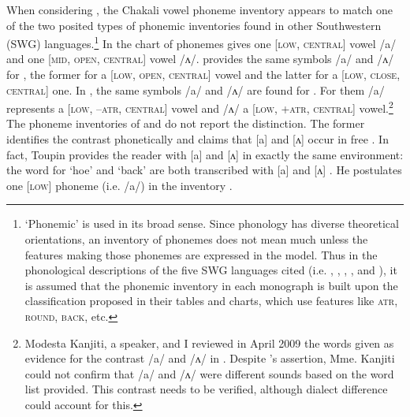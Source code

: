 When considering  \cite{Rowl65, Crou66, Gray69,   Toup95, Crou03}, the Chakali vowel phoneme 
inventory appears to match one of the two posited types of  phonemic inventories found in other  
Southwestern  (SWG) languages.\footnote{`Phonemic' is used in its broad sense. Since phonology 
has diverse theoretical orientations,  an inventory of phonemes does not mean much unless the 
features making those phonemes are expressed in the model.  Thus in the phonological descriptions 
of the five SWG languages cited (i.e. , , ,  , and  ), it is assumed 
that the phonemic inventory in each monograph is built upon the classification proposed in their 
tables and charts, which use features like \textsc{atr}, \textsc{round}, \textsc{back}, etc.} In 
\citet[15]{Rowl65} the chart of  phonemes gives one [\textsc{low}, \textsc{central}] vowel 
/a/ and one [\textsc{mid}, \textsc{open}, \textsc{central}] vowel /ʌ/. \citet[17]{Crou66} provides 
the same symbols /a/ and /ʌ/ for , the former for a [\textsc{low}, \textsc{open}, 
\textsc{central}] vowel and the latter for a [\textsc{low}, \textsc{close}, \textsc{central}] one. 
In \citet[3]{Crou03}, the same symbols /a/ and /ʌ/ are found for . For them /a/ represents a 
[\textsc{low}, \textsc{--atr}, \textsc{central}] vowel and /ʌ/ a [\textsc{low}, \textsc{+atr}, 
\textsc{central}] vowel.\footnote{\label{fn:info-deg}Modesta Kanjiti, a   speaker,  and I 
reviewed  in April 2009 the words given as evidence for the contrast /a/ and /ʌ/ in 
\citet[20--21]{Crou03}. Despite  \citeauthor{Crou03}'s assertion,   Mme. Kanjiti could not confirm that /a/ 
and /ʌ/ were different sounds based on the word list provided. This contrast needs to be verified, 
although dialect difference could account for this.}   The phoneme inventories of \citet[16]{Toup95} 
and  \citet[21]{Gray69} do not report the distinction. The former identifies the contrast 
phonetically and claims that [a] and [ʌ] occur in free . In fact, Toupin provides the 
reader with [a] and [ʌ] in exactly the same environment: the word for `hoe' and `back' are both 
transcribed with [a] and [ʌ]  \citep[26]{Toup95}. He postulates one [\textsc{low}] phoneme (i.e.  
/a/) in the inventory \citep[16]{Toup95}.

